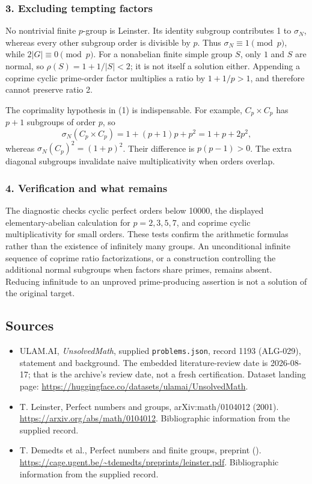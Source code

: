 \documentclass[11pt,a4paper]{article}
\begin{document}
\subsubsection{3. Excluding tempting factors}
No nontrivial finite $p$-group is Leinster. Its identity subgroup contributes 1 to $\sigma_N$, whereas every other subgroup order is divisible by $p$. Thus $\sigma_N\equiv1\pmod p$, while $2|G|\equiv0\pmod p$. For a nonabelian finite simple group $S$, only $1$ and $S$ are normal, so $\rho(S)=1+1/|S|<2$; it is not itself a solution either. Appending a coprime cyclic prime-order factor multiplies a ratio by $1+1/p>1$, and therefore cannot preserve ratio 2.

The coprimality hypothesis in (1) is indispensable. For example, $C_p\times C_p$ has $p+1$ subgroups of order $p$, so
\[\sigma_N(C_p\times C_p)=1+(p+1)p+p^2=1+p+2p^2,
\]
whereas $\sigma_N(C_p)^2=(1+p)^2$. Their difference is $p(p-1)>0$. The extra diagonal subgroups invalidate naive multiplicativity when orders overlap.

\subsubsection{4. Verification and what remains}
The diagnostic checks cyclic perfect orders below 10000, the displayed elementary-abelian calculation for $p=2,3,5,7$, and coprime cyclic multiplicativity for small orders. These tests confirm the arithmetic formulas rather than the existence of infinitely many groups. An unconditional infinite sequence of coprime ratio factorizations, or a construction controlling the additional normal subgroups when factors share primes, remains absent. Reducing infinitude to an unproved prime-producing assertion is not a solution of the original target.

\subsection{Sources}

{\small

\begin{itemize}

\item[\hypertarget{source:1193:1}{S1}] ULAM.AI, \emph{UnsolvedMath}, supplied \texttt{problems.json}, record 1193 (ALG-029), statement and background. The embedded literature-review date is 2026-08-17; that is the archive’s review date, not a fresh certification. Dataset landing page: \url{https://huggingface.co/datasets/ulamai/UnsolvedMath}.

\item[\hypertarget{source:1193:2}{S2}] T. Leinster, Perfect numbers and groups, arXiv:math/0104012 (2001). \url{https://arxiv.org/abs/math/0104012}. Bibliographic information from the supplied record.

\item[\hypertarget{source:1193:3}{S3}] T. Demedts et al., Perfect numbers and finite groups, preprint (). \url{https://cage.ugent.be/~tdemedts/preprints/leinster.pdf}. Bibliographic information from the supplied record.

\end{itemize}

}

\label{end:1193}
\end{document}
